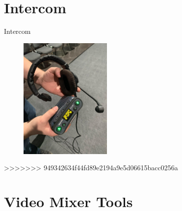 \documentclass[aspectratio=169]{beamer}
\begin{document}
\section{Intercom} %
 \begin{frame}{Intercom}
 	\begin{figure} 
 		\centering
 		\includegraphics[width=0.4\textwidth]{images/intercom_36c3.jpg}
 	\end{figure}
\end{frame}
>>>>>>> 949342634f44fd89e2194a9e5d06615bacc0256a

\section{Video Mixer Tools}
\end{document}
